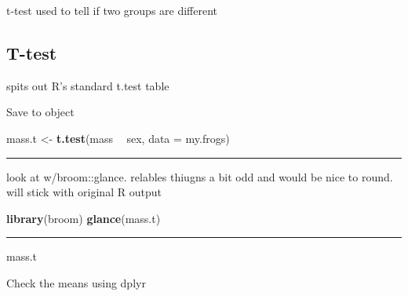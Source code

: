 \documentclass[]{book}
\newenvironment{Shaded}{\begin{snugshade}}{\end{snugshade}}
\newcommand{\KeywordTok}[1]{\textcolor[rgb]{0.13,0.29,0.53}{\textbf{#1}}}
\newcommand{\DataTypeTok}[1]{\textcolor[rgb]{0.13,0.29,0.53}{#1}}
\newcommand{\StringTok}[1]{\textcolor[rgb]{0.31,0.60,0.02}{#1}}
\newcommand{\OperatorTok}[1]{\textcolor[rgb]{0.81,0.36,0.00}{\textbf{#1}}}
\newcommand{\NormalTok}[1]{#1}
\theoremstyle{definition}
\theoremstyle{definition}
\theoremstyle{definition}
\theoremstyle{remark}
\begin{document}
t-test used to tell if two groups are different

\subsection{T-test}\label{t-test}

spits out R's standard t.test table

Save to object

\begin{Shaded}
\begin{Highlighting}[]
\NormalTok{mass.t <-}\StringTok{  }\KeywordTok{t.test}\NormalTok{(mass }\OperatorTok{~}\StringTok{ }\NormalTok{sex, }\DataTypeTok{data =}\NormalTok{ my.frogs)}
\end{Highlighting}
\end{Shaded}

\begin{center}\rule{0.5\linewidth}{\linethickness}\end{center}

look at w/broom::glance. relables thiugns a bit odd and would be nice to
round. will stick with original R output

\begin{Shaded}
\begin{Highlighting}[]
\KeywordTok{library}\NormalTok{(broom)}
\KeywordTok{glance}\NormalTok{(mass.t)}
\end{Highlighting}
\end{Shaded}

\begin{center}\rule{0.5\linewidth}{\linethickness}\end{center}

\begin{Shaded}
\begin{Highlighting}[]
\NormalTok{mass.t}
\end{Highlighting}
\end{Shaded}

Check the means using dplyr

\begin{Shaded}
\end{Shaded}
\end{document}
